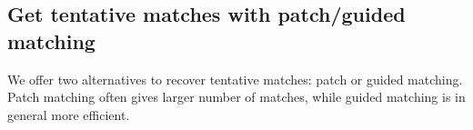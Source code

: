 \subsection{Get tentative matches with patch/guided matching}\label{patch matching}
We offer two alternatives to recover tentative matches: patch or guided matching.  %
Patch matching often gives larger number of matches, while guided matching is in general more efficient.

